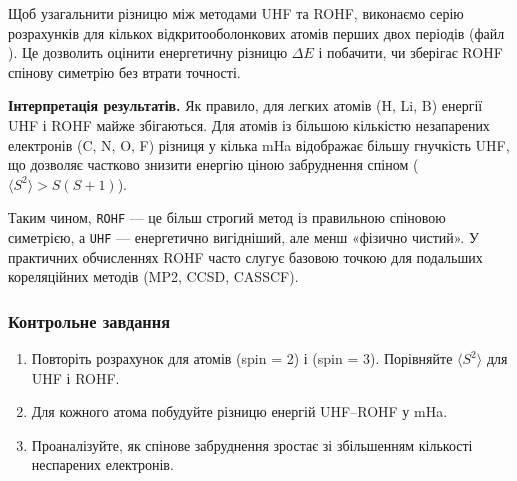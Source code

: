 Щоб узагальнити різницю між методами UHF та ROHF, виконаємо серію розрахунків для
кількох відкритооболонкових атомів перших двох періодів (файл ). Це дозволить оцінити енергетичну різницю $\Delta E$ і побачити, чи зберігає ROHF спінову симетрію без втрати точності.

\noindent
\textbf{Інтерпретація результатів.}
Як правило, для легких атомів (H, Li, B) енергії UHF і ROHF майже збігаються.
Для атомів із більшою кількістю незапарених електронів (C, N, O, F)
різниця у кілька mHa відображає більшу гнучкість UHF,
що дозволяє частково знизити енергію ціною забруднення спіном
($\langle S^2 \rangle > S(S+1)$).

Таким чином, \texttt{ROHF} --- це більш строгий метод із правильною спіновою симетрією,
а \texttt{UHF} --- енергетично вигідніший, але менш «фізично чистий». У практичних
обчисленнях ROHF часто слугує базовою точкою для подальших кореляційних
методів (MP2, CCSD, CASSCF).

\subsubsection{Контрольне завдання}

\begin{enumerate}
    \item Повторіть розрахунок для атомів  (spin = 2) і  (spin = 3).
    Порівняйте $\langle S^2 \rangle$ для UHF і ROHF.
    \item Для кожного атома побудуйте різницю енергій UHF–ROHF у mHa.
    \item Проаналізуйте, як спінове забруднення зростає зі збільшенням кількості неспарених електронів.
\end{enumerate}